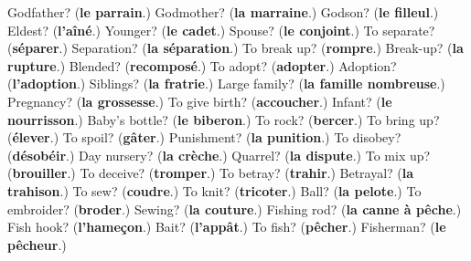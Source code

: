 \begin{tcolorbox}[breakable,colback=teal!4,colframe=teal!35!black,title={Before you move on}]
Godfather? (\textbf{le parrain}.) Godmother? (\textbf{la marraine}.) Godson? (\textbf{le filleul}.) Eldest? (\textbf{l'aîné}.) Younger? (\textbf{le cadet}.) Spouse? (\textbf{le conjoint}.) To separate? (\textbf{séparer}.) Separation? (\textbf{la séparation}.) To break up? (\textbf{rompre}.) Break-up? (\textbf{la rupture}.) Blended? (\textbf{recomposé}.) To adopt? (\textbf{adopter}.) Adoption? (\textbf{l'adoption}.) Siblings? (\textbf{la fratrie}.) Large family? (\textbf{la famille nombreuse}.) Pregnancy? (\textbf{la grossesse}.) To give birth? (\textbf{accoucher}.) Infant? (\textbf{le nourrisson}.) Baby's bottle? (\textbf{le biberon}.) To rock? (\textbf{bercer}.) To bring up? (\textbf{élever}.) To spoil? (\textbf{gâter}.) Punishment? (\textbf{la punition}.) To disobey? (\textbf{désobéir}.) Day nursery? (\textbf{la crèche}.) Quarrel? (\textbf{la dispute}.) To mix up? (\textbf{brouiller}.) To deceive? (\textbf{tromper}.) To betray? (\textbf{trahir}.) Betrayal? (\textbf{la trahison}.) To sew? (\textbf{coudre}.) To knit? (\textbf{tricoter}.) Ball? (\textbf{la pelote}.) To embroider? (\textbf{broder}.) Sewing? (\textbf{la couture}.) Fishing rod? (\textbf{la canne à pêche}.) Fish hook? (\textbf{l'hameçon}.) Bait? (\textbf{l'appât}.) To fish? (\textbf{pêcher}.) Fisherman? (\textbf{le pêcheur}.)
\end{tcolorbox}
